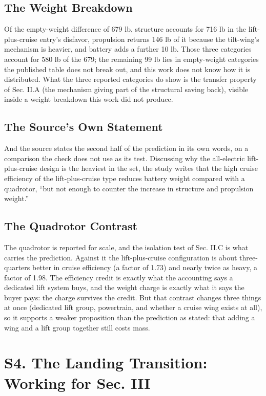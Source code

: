 \documentclass[journal]{new-aiaa}
\begin{document}
\subsection*{The Weight Breakdown}

Of the empty-weight difference of 679 lb, structure accounts for 716 lb in the lift-plus-cruise entry's disfavor, propulsion returns 146 lb of it because the tilt-wing's mechanism is heavier, and battery adds a further 10 lb. Those three categories account for 580 lb of the 679; the remaining 99 lb lies in empty-weight categories the published table does not break out, and this work does not know how it is distributed. What the three reported categories do show is the transfer property of Sec. II.A (the mechanism giving part of the structural saving back), visible inside a weight breakdown this work did not produce.

\subsection*{The Source's Own Statement}

And the source states the second half of the prediction in its own words, on a comparison the check does not use as its test. Discussing why the all-electric lift-plus-cruise design is the heaviest in the set, the study writes that the high cruise efficiency of the lift-plus-cruise type reduces battery weight compared with a quadrotor, ``but not enough to counter the increase in structure and propulsion weight.''

\subsection*{The Quadrotor Contrast}

The quadrotor is reported for scale, and the isolation test of Sec. II.C is what carries the prediction. Against it the lift-plus-cruise configuration is about three-quarters better in cruise efficiency (a factor of 1.73) and nearly twice as heavy, a factor of 1.98. The efficiency credit is exactly what the accounting says a dedicated lift system buys, and the weight charge is exactly what it says the buyer pays: the charge survives the credit. But that contrast changes three things at once (dedicated lift group, powertrain, and whether a cruise wing exists at all), so it supports a weaker proposition than the prediction as stated: that adding a wing and a lift group together still costs mass.

\section*{S4. The Landing Transition: Working for Sec. III}
\end{document}
